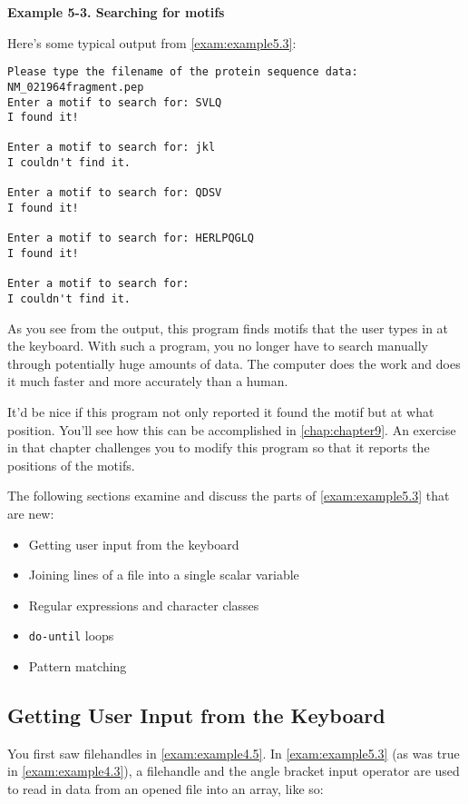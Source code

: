 \textbf{Example 5-3. Searching for motifs}


Here's some typical output from \autoref{exam:example5.3}:

\begin{lstlisting}
Please type the filename of the protein sequence data:
NM_021964fragment.pep
Enter a motif to search for: SVLQ
I found it!

Enter a motif to search for: jkl
I couldn't find it.

Enter a motif to search for: QDSV
I found it!

Enter a motif to search for: HERLPQGLQ
I found it!

Enter a motif to search for: 
I couldn't find it. 
\end{lstlisting}

As you see from the output, this program finds motifs that the user types in at the keyboard. With such a program, you no longer have to search manually through potentially huge amounts of data. The computer does the work and does it much faster and more accurately than a human.

It'd be nice if this program not only reported it found the motif but at what position. You'll see how this can be accomplished in \autoref{chap:chapter9}. An exercise in that chapter challenges you to modify this program so that it reports the positions of the motifs.

The following sections examine and discuss the parts of \autoref{exam:example5.3} that are new:

\begin{itemize}
  \item Getting user input from the keyboard
  \item Joining lines of a file into a single scalar variable
  \item Regular expressions and character classes
  \item \verb|do-until| loops
  \item Pattern matching
\end{itemize}

\subsection{Getting User Input from the Keyboard}
You first saw filehandles in \autoref{exam:example4.5}. In \autoref{exam:example5.3} (as was true in \autoref{exam:example4.3}), a filehandle and the angle bracket input operator are used to read in data from an opened file into an array, like so:

